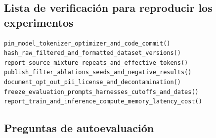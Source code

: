 \subsection{Lista de verificación para reproducir los experimentos}

\begin{lstlisting}[caption={Lista unificada de reproducción para proyectos de preentrenamiento}]
pin_model_tokenizer_optimizer_and_code_commit()
hash_raw_filtered_and_formatted_dataset_versions()
report_source_mixture_repeats_and_effective_tokens()
publish_filter_ablations_seeds_and_negative_results()
document_opt_out_pii_license_and_decontamination()
freeze_evaluation_prompts_harnesses_cutoffs_and_dates()
report_train_and_inference_compute_memory_latency_cost()
\end{lstlisting}

\subsection{Preguntas de autoevaluación}

